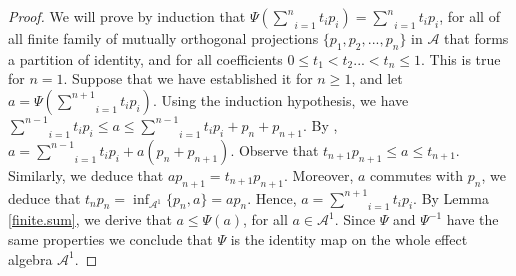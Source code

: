 \documentclass[12pt]{amsart}
\theoremstyle{definition}
\theoremstyle{remark}
\numberwithin{equation}{section}
\begin{document}
\begin{proof}
We will prove by induction that $\Psi\left( \underset{i=1}{\overset{n}{\sum}} t_ip_i\right)= \underset{i=1}{\overset{n}{\sum}} t_ip_i$, for all  of all finite family of mutually orthogonal projections  $\{p_1,p_2,...,p_n\}$ in $\mathcal{A}$ that forms a partition of identity, and for all coefficients  $0\leq t_1<t_2...<t_n\leq1$.  This is true
for $n=1$.  Suppose that we have established it for $n\geq 1$, and let $a=\Psi\left( \underset{i=1}{\overset{n+1}{\sum}} t_ip_i\right)$. Using the induction hypothesis, we have $\underset{i=1}{\overset{n-1}{\sum}} t_ip_i\leq a\leq \underset{i=1}{\overset{n-1}{\sum}} t_ip_i+ p_n+p_{n+1}$. By \cite[Lemma 3.2]{Semrl},  $a=\underset{i=1}{\overset{n-1}{\sum}} t_ip_i+a(p_n+p_{n+1})$. Observe that  $t_{n+1}p_{n+1}\leq a\leq t_{n+1}$. Similarly, we deduce  that $ap_{n+1}=t_{n+1}p_{n+1}$. Moreover, $a$ commutes with $p_n$, we deduce that $t_np_n=\inf_{\mathcal{A}^1}\{p_n,a\}=ap_n$. Hence, $a=\underset{i=1}{\overset{n+1}{\sum}} t_ip_i$.
By Lemma \ref{finite.sum}, we derive that $a\leq \Psi(a)$, for all $a\in\mathcal{A}^1$. Since $\Psi$ and $\Psi^{-1}$ have the same properties we conclude that   $\Psi$ is the identity map on the whole effect algebra $\mathcal{A}^1$.


\end{proof}
\end{document}
